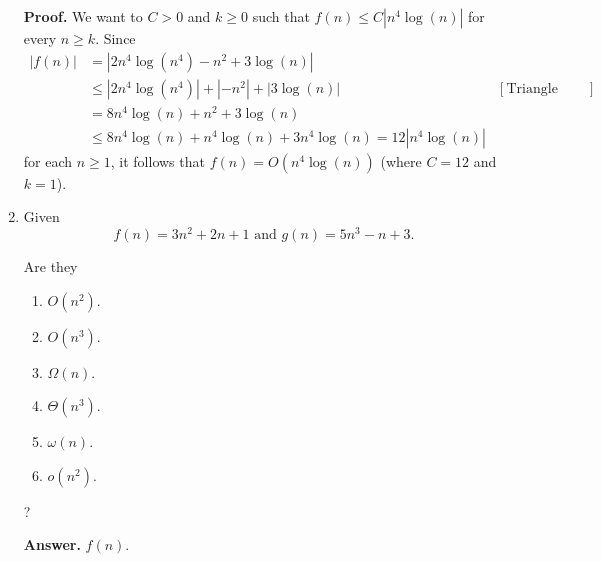\documentclass[9pt]{article}
\begin{document}
\begin{enumerate}
      \textbf{Proof.} We want to $C > 0$ and $k \ge 0$ such
      that $f(n) \le C|n^4\log(n)|$ for every $n \ge k$. Since
      \begin{align*}
         |f(n)| &= |2n^4\log(n^4) - n^2 + 3\log(n)| \\
            &\le |2n^4\log(n^4)| + |-n^2| + |3\log(n)|
                   &[\text{Triangle Inequality}] \\
            &= 8n^4\log(n) + n^2 + 3\log(n) \\
            &\le  8n^4\log(n) + n^4\log(n) + 3n^4\log(n) = 12|n^4\log(n)|
      \end{align*}
      for each $n \ge 1$, it follows that $f(n) = O(n^4\log(n))$ (where $C = 12$
      and $k = 1$).
   \item Given
         $$f(n) = 3n^2 + 2n + 1 \text{ and } g(n) = 5n^3 - n + 3.$$

         Are they
         \begin{enumerate}
            \item $O(n^2)$.
            \item $O(n^3)$.
            \item $\Omega(n)$.
            \item $\Theta(n^3)$.
            \item $\omega(n)$.
            \item $o(n^2)$.
         \end{enumerate}
         ?

      \textbf{Answer.} $f(n)$.


\end{enumerate}
\end{document}
